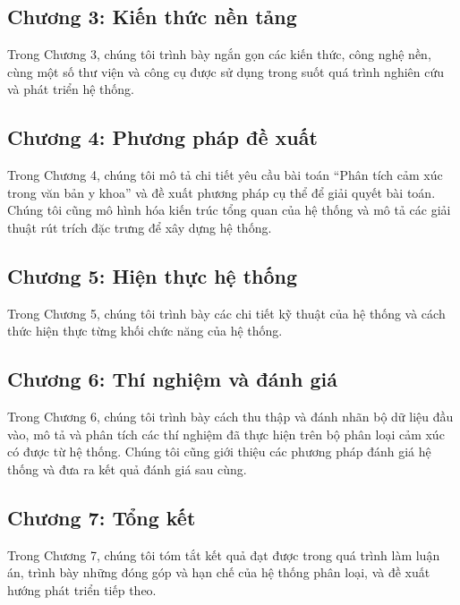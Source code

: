 \subsection*{Chương 3: Kiến thức nền tảng}
Trong Chương 3, chúng tôi trình bày ngắn gọn các kiến thức, công nghệ nền, cùng một số thư viện và công cụ được sử dụng trong suốt quá trình nghiên cứu và phát triển hệ thống.
\subsection*{Chương 4: Phương pháp đề xuất}
Trong Chương 4, chúng tôi mô tả chi tiết yêu cầu bài toán ``Phân tích cảm xúc trong văn bản y khoa'' và đề xuất phương pháp cụ thể để giải quyết bài toán. Chúng tôi cũng mô hình hóa kiến trúc tổng quan của hệ thống và mô tả các giải thuật rút trích đặc trưng để xây dựng hệ thống.
\subsection*{Chương 5: Hiện thực hệ thống}
Trong Chương 5, chúng tôi trình bày các chi tiết kỹ thuật của hệ thống và cách thức hiện thực từng khối chức năng của hệ thống.
\subsection*{Chương 6: Thí nghiệm và đánh giá}
Trong Chương 6, chúng tôi trình bày cách thu thập và đánh nhãn bộ dữ liệu đầu vào, mô tả và phân tích các thí nghiệm đã thực hiện trên bộ phân loại cảm xúc có được từ hệ thống. Chúng tôi cũng giới thiệu các phương pháp đánh giá hệ thống và đưa ra kết quả đánh giá sau cùng.
\subsection*{Chương 7: Tổng kết}
Trong Chương 7, chúng tôi tóm tắt kết quả đạt được trong quá trình làm luận án, trình bày những đóng góp và hạn chế của hệ thống phân loại, và đề xuất hướng phát triển tiếp theo.

